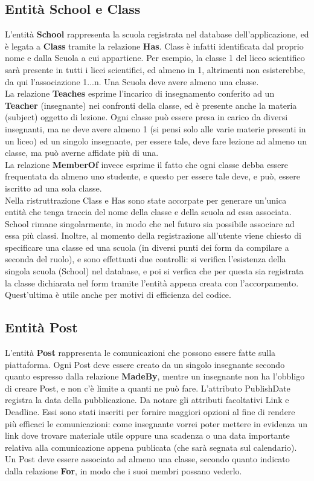 \documentclass[Lau, binding=0.6cm, oneside]{sapthesis}
\begin{document}
\subsection{Entità School e Class}
L'entità \textbf{School} rappresenta la scuola registrata nel database dell'applicazione, ed è legata a \textbf{Class} tramite la relazione \textbf{Has}. Class è infatti identificata dal proprio nome e dalla Scuola a cui appartiene. Per esempio, la classe 1 del liceo scientifico sarà presente in tutti i licei scientifici, ed almeno in 1, altrimenti non esisterebbe, da qui l'associazione 1...n. Una Scuola deve avere almeno una classe.\\
La relazione \textbf{Teaches} esprime l'incarico di insegnamento conferito ad un \textbf{Teacher} (insegnante) nei confronti della classe, ed è presente anche la materia (subject) oggetto di lezione. Ogni classe può essere presa in carico da diversi insegnanti, ma ne deve avere almeno 1 (si pensi solo alle varie materie presenti in  un liceo) ed un singolo insegnante, per essere tale, deve fare lezione ad almeno un classe, ma può averne affidate più di una.\\
La relazione \textbf{MemberOf} invece esprime il fatto che ogni classe debba essere frequentata da almeno uno studente, e questo per essere tale deve, e può, essere iscritto ad una sola classe.\\
Nella ristruttrazione Class e Has sono state accorpate per generare un'unica entità che tenga traccia del nome della classe e della scuola ad essa associata. School rimane singolarmente, in modo che nel futuro sia possibile associare ad essa più classi. Inoltre, al momento della registrazione
all'utente viene chiesto di specificare una classe ed una scuola (in diversi punti dei form da compilare a seconda del ruolo), e sono effettuati due controlli: si verifica l'esistenza della singola scuola (School) nel database, e poi si verfica che per questa sia registrata la classe dichiarata nel form tramite l'entità appena creata con l'accorpamento. Quest'ultima è utile anche per motivi di efficienza del codice.

\subsection{Entità Post}
L'entità \textbf{Post} rappresenta le comunicazioni che possono essere fatte sulla piattaforma. Ogni Post deve essere creato da un singolo insegnante secondo quanto espresso dalla relazione \textbf{MadeBy}, mentre un insegnante non ha l'obbligo di creare Post, e non c'è limite a quanti ne può fare. L'attributo PublishDate registra la data della pubblicazione.
Da notare gli attributi facoltativi Link e Deadline. Essi sono stati inseriti per fornire maggiori opzioni al fine di rendere più efficaci le comunicazioni: come insegnante vorrei poter mettere in evidenza un link dove trovare materiale utile oppure una scadenza o una data importante relativa alla comunicazione appena publicata (che sarà segnata sul calendario).\\
Un Post deve essere associato ad almeno una classe, secondo quanto indicato dalla relazione \textbf{For}, in modo che i suoi membri possano vederlo.
\end{document}
